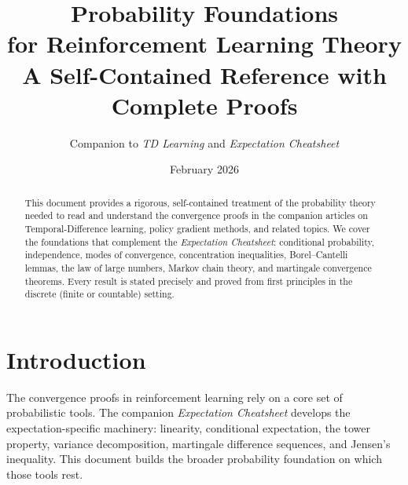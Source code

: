 \documentclass[11pt,a4paper]{article}
\title{\textbf{Probability Foundations\\for Reinforcement Learning Theory}\\[10pt]
\large A Self-Contained Reference with Complete Proofs}
\author{Companion to \emph{TD Learning} and \emph{Expectation Cheatsheet}}
\date{February 2026}
\theoremstyle{definition}
\theoremstyle{plain}
\theoremstyle{remark}
\begin{document}
\maketitle

\begin{abstract}
This document provides a rigorous, self-contained treatment of the probability theory
needed to read and understand the convergence proofs in the companion articles on
Temporal-Difference learning, policy gradient methods, and related topics. We cover
the foundations that complement the \emph{Expectation Cheatsheet}: conditional
probability, independence, modes of convergence, concentration inequalities,
Borel--Cantelli lemmas, the law of large numbers, Markov chain theory, and
martingale convergence theorems. Every result is stated precisely and proved from
first principles in the discrete (finite or countable) setting.
\end{abstract}

\tableofcontents
\newpage

\section{Introduction}
\label{sec:intro}

The convergence proofs in reinforcement learning rely on a core set of probabilistic
tools. The companion \emph{Expectation Cheatsheet} develops the expectation-specific
machinery: linearity, conditional expectation, the tower property, variance
decomposition, martingale difference sequences, and Jensen's inequality. This
document builds the broader probability foundation on which those tools rest.
\end{document}
